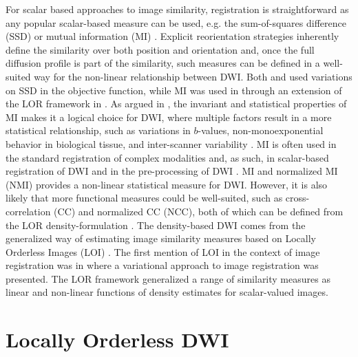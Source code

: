 \documentclass[twocolumn]{svjour3}
\begin{document}
For scalar based approaches to image similarity, registration is straightforward as any
popular scalar-based measure can be used, e.g. the sum-of-squares difference (SSD)
\cite{yeo2009dt} or mutual information (MI)
\cite{wells1996mmv,wang2017evaluations}. Explicit reorientation strategies inherently
define the similarity over both position and orientation and, once the full diffusion
profile is part of the similarity, such measures can be defined in a well-suited way for
the non-linear relationship between DWI. Both \cite{zhang2006deformable} and
\cite{yeo2009dt} used variations on SSD in the objective function, while MI was used in
\cite{jensen2015locally} through an extension of the LOR framework in
\cite{darkner2013locally}. As argued in \cite{jensen2015locally}, the invariant and
statistical properties of MI makes it a logical choice for DWI, where multiple factors
result in a more statistical relationship, such as variations in $b$-values,
non-monoexponential behavior in biological tissue, and inter-scanner variability
\cite{johansen2013diffusion}. MI is often used in the standard registration of complex
modalities and, as such, in scalar-based registration of DWI \cite{van2007nonrigid} and in
the pre-processing of DWI \cite{treiber2016characterization}. MI and normalized MI (NMI)
\cite{studholme1999overlap} provides a non-linear statistical measure for DWI. However, it
is also likely that more functional measures could be well-suited, such as
cross-correlation (CC) and normalized CC (NCC), both of which can be defined from the LOR
density-formulation \cite{sporring2011jacobians,darknersporring2012pami}. The
density-based DWI comes from the generalized way of estimating image similarity measures
based on Locally Orderless Images (LOI) \cite{koenderink1999structure}. The first mention
of LOI in the context of image registration was in \cite{hermosillo2002variational} where
a variational approach to image registration was presented. The LOR framework
\cite{darknersporring2011ipmi,darknersporring2012pami} generalized a range of similarity
measures as linear and non-linear functions of density estimates for scalar-valued images.


\section{Locally Orderless DWI}
\label{sec:lor_dwi}
\end{document}
